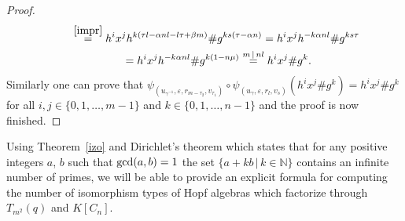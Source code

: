\documentclass[10pt,a4paper]{amsart}
\numberwithin{equation}{section}
\begin{document}
\begin{proof}
\begin{gather*}
\qquad{} \stackrel{\eqref{impr}} {=} h^{i}x^{j} h^{k(\tau l - \alpha n l - l \tau + \beta m)} \# g^{ks(\tau - \alpha n)}
 = h^{i}x^{j} h^{-k \alpha n l } \# g^{ks\tau} \\
 \qquad \ {} = h^{i}x^{j} h^{-k \alpha n l } \# g^{k(1-n \mu)} \stackrel{m \,|\, nl} = h^{i}x^{j} \# g^{k}.
\end{gather*}
Similarly one can prove that $\psi_{(u_{\gamma^{-1}}, \varepsilon, r_{m-\tau_{2}}, v_{\tau_{1}})} \circ \psi_{(u_{\gamma}, \varepsilon, r_{l}, v_{s})} (h^{i}x^{j} \# g^{k}) = h^{i}x^{j} \# g^{k}$ for all $i, j \in \{0, 1,\dots, m-1\}$ and $k \in \{0, 1,\dots, n-1\}$ and the proof is now finished.
\end{proof}


Using Theorem~\ref{izo} and Dirichlet's theorem \cite[Theorem~7.9]{ap} which states that for any positive integers $a$, $b$ such that ${\rm gcd}(a, b) = 1$ the set $\{a+kb \,|\, k \in \mathbb{N}\}$ contains an infinite number of primes, we will be able to provide an explicit formula for computing the number of isomorphism types of Hopf algebras which factorize through $T_{m^{2}}(q)$ and $K[C_n]$.
\end{document}
